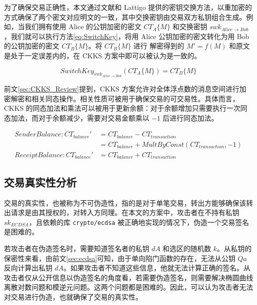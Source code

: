 为了确保交易正确性，本文通过文献\cite{brakerski2014leveled}和 Lattigo 提供的密钥交换方法，以重加密的方式确保了两个密文对应明文的一致，其中交换密钥由交易双方私钥组合生成。例如，当我们拥有使用 Alice 的公钥加密的密文 $CT_{A}\{M\}$ 和交换密钥 $swk_{Alice \rightarrow Bob}$，我们就可以执行方法\eqref{eq:SwitchKey}，将用 Alice 公钥加密的密文转化为用 Bob 的公钥加密的密文 $CT_{B}\{M\}$。将 $CT_{B}\{M\}$ 进行 解密得到的 $M' = f(M)$ 和原文是处于一定误差内的，在 CKKS 方案中即可以被认为是一致的。

\begin{equation} \label{eq:SwitchKey}
    SwitchKey_{swk_{Alice \rightarrow Bob}}(CT_{A}\{M\}) = CT_{B}\{M\}
\end{equation}

前文\ref{sec:CKKS_Review}提到，CKKS 方案允许对全体浮点数的消息空间进行加密解密和相关同态操作。相关性质可被用于确保交易的可交易性。具体而言，CKKS 的同态加法和乘法可以被用于更新余额：对于余额增加只需要执行一次同态加法，而对于余额减少，需要对交易金额乘以 $-1$ 后进行同态加法。

\begin{equation}
\begin{aligned}
    Sender Balance:  CT_{balance}' & = CT_{balance} - CT_{transaction}\\
    &= CT_{balance} + MultByConst(CT_{transaction}, -1)\\
    Receipt Balance: CT_{balance}' & = CT_{balance} + CT_{transaction}
\end{aligned}
\end{equation}

\subsection{交易真实性分析}

交易的真实性，也被称为不可伪造性，指的是对于单笔交易，转出方能够确保该转出请求是由其授权的，对转入方同理。在本文的方案中，攻击者在不持有私钥 $sk_{ECDSA}$，且依赖的库 \verb|crypto/ecdsa| 被正确地实现的情况下，伪造一个交易签名是困难的。

若攻击者在伪造签名时，需要知道签名者的私钥 $dA$ 和选区的随机数 $k$。从私钥的保密性来看，由前文\ref{sec:ecdsa}可知，由于单向陷门函数的存在，无法从公钥 $Qa$ 反向计算出私钥 $dA$。如果攻击者不知道这些信息，他就无法计算正确的签名。从攻击者仅从公开信息以伪造签名的角度看，若需要伪造签名，则需要解决椭圆曲线离散对数问题\cite{Hankerson2011}和模逆元问题。这两个问题都是困难的。因此，可以认为攻击者无法对交易进行伪造，也就确保了交易的真实性。
